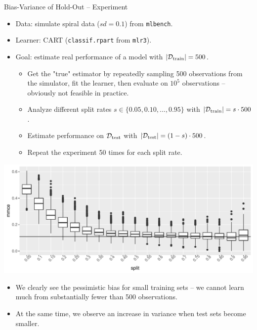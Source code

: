 \documentclass[11pt,compress,t,notes=noshow, xcolor=table]{beamer}
\begin{document}
\begin{vbframe}{Bias-Variance of Hold-Out -- Experiment}

\begin{itemize}
  \item Data: simulate spiral data ($sd = 0.1$) from \texttt{mlbench}.
  \item Learner: CART (\texttt{classif.rpart} from \texttt{mlr3}).
  \item Goal: estimate real performance of a model with $|\mathcal{D}_{\text{train}}| = 500$.
  \begin{itemize}
    \item Get the "true" estimator by repeatedly sampling 500 observations from 
    the simulator, fit the learner, then evaluate on $10^5$ observations -- 
    obviously not feasible in practice.
    \item Analyze different split rates $s \in \{0.05, 0.10, ..., 0.95\}$ 
    with $|\mathcal{D}_{\text{train}}| = s \cdot 500$.
    \item Estimate performance on $\mathcal{D}_{\text{test}}$ with $|\mathcal{D}_{\text{test}}| = (1 - s) \cdot 500$.
    \item Repeat the experiment 50 times for each split rate.
  \end{itemize}
\end{itemize}

\framebreak


\includegraphics[width=\textwidth]{figure/test-holdout-example} 

\lz

\begin{itemize}
  \item We clearly see the pessimistic bias for small training sets -- we cannot 
  learn much from substantially fewer than 500 observations. 
  \item At the same time, we observe an increase in variance when test sets 
  become smaller.
\end{itemize}


\end{vbframe}
\end{document}

